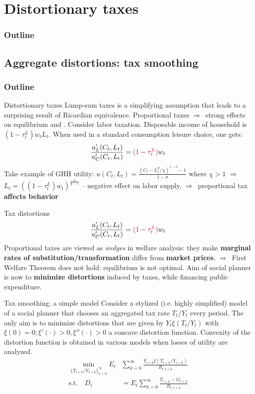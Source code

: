 \documentclass{beamer}
\newcommand{\tb}[1]{{\color{blue}{\textbf{#1}}}}
\newcommand{\rarr}{$\Rightarrow$\ }
\begin{document}
\section{Distortionary taxes}
\begin{frame}
\frametitle{Outline}
\tableofcontents[currentsection]
\end{frame}
\subsection{Aggregate distortions: tax smoothing}
\begin{frame}
\frametitle{Outline}
\tableofcontents[currentsubsection]
\end{frame}
\begin{frame}{Distortionary taxes}
  Lump-sum taxes is a simplifying assumption that leads to a surprising result of Ricardian equivalence.
  \vfill
  Proportional taxes \rarr strong effects on equilibrium and \tb{welfare}.
  \vfill 
  Consider labor taxation. Disposable income of household is $(1-\tau^L_t)w_t L_t$. When used in a standard consumption leisure choice, one gets: 
  $$ \frac{u'_L(C_t, L_t)}{u'_C(C_t, L_t)} = \textcolor{purple}{(1-\tau^L_t)}w_t$$
  Take example of GHH utility: $ u(C_t,L_t) = \frac{\left( C_t-L_t^{\chi}/\chi \right)^{1-\sigma} -1 } {1-\sigma}$ where $\chi>1$ \rarr 
  $ L_t = ((1-\tau^L_t)w_t)^{\frac{1}{\chi-1}} $ -- negative effect on labor supply, \rarr proportional tax \textbf{affects behavior}
\end{frame}

\begin{frame}{Tax distortions}
  $$ \frac{u'_L(C_t, L_t)}{u'_C(C_t, L_t)} = \textcolor{purple}{(1-\tau^L_t)}w_t$$
  Proportional taxes are viewed as \textit{wedges} in welfare analysis: they make \textbf{marginal rates of substitution/transformation} differ from \textbf{market prices}. 
\vfill
\rarr First Welfare Theorem does not hold: equilibrium is not optimal.  
\vfill Aim of social planner is now to \textbf{minimize distortions} induced by taxes, while financing public expenditure.
\end{frame}

\begin{frame}{Tax smoothing: a simple model}
  Consider a stylized (i.e. highly simplified) model of a social planner that chooses an aggregated tax rate $T_t/Y_t$ every period. 
\vfill
The only aim is to minimize distortions that are given by $Y_t \xi(T_t/Y_t)$ with $\xi(0) = 0; \xi'(\cdot)>0, \xi''(\cdot)>0$ a concave distortion function. Convexity of the distortion function is obtained in various  models when losses of utility are analyzed.
  \begin{align*}
	\min_{\{T_{t+k}/Y_{t+k}\}_{k=0}^\infty} E_t &\sum_{k=0}^\infty \frac{Y_{t+k} \xi(T_{t+k}/Y_{t+k})}{R_{t,t+k}} \\
	\text{s.t.} \quad D_t &= E_t \sum_{k=0}^\infty  \frac{T_{t+k} - G_{t+k}}{R_{t,t+k}}
  \end{align*}
\end{frame}
\end{document}
